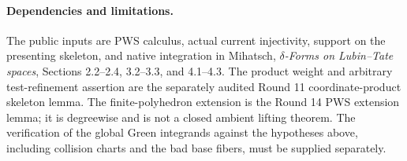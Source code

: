 \paragraph{Dependencies and limitations.}
The public inputs are PWS calculus, actual current injectivity,
support on the presenting skeleton, and native integration in
Mihatsch, \emph{$\delta$-Forms on Lubin--Tate spaces}, Sections
2.2--2.4, 3.2--3.3, and 4.1--4.3.  The product weight and arbitrary
test-refinement assertion are the separately audited Round 11
coordinate-product skeleton lemma.  The finite-polyhedron extension
is the Round 14 PWS extension lemma; it is degreewise and is not a
closed ambient lifting theorem.  The verification of the global
Green integrands against the hypotheses above, including collision
charts and the bad base fibers, must be supplied separately.
